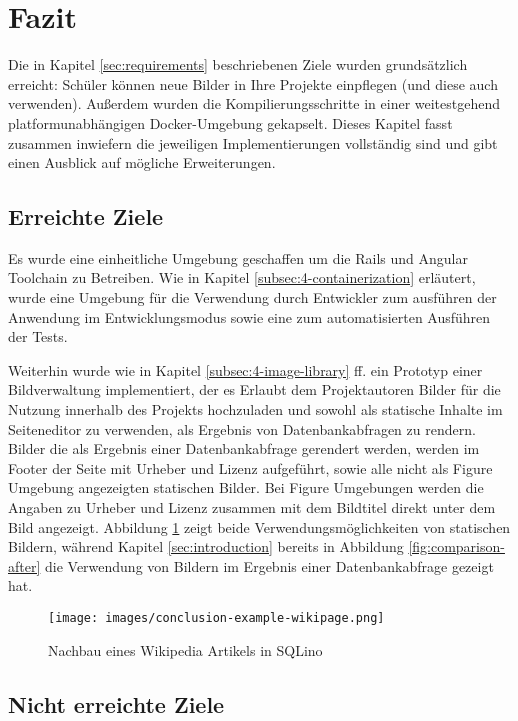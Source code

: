 \section{Fazit}
\label{sec:conclusion}

Die in Kapitel \ref{sec:requirements} beschriebenen Ziele wurden grundsätzlich erreicht:
Schüler können neue Bilder in Ihre Projekte einpflegen (und diese auch verwenden).
Außerdem wurden die Kompilierungsschritte in einer weitestgehend
platformunabhängigen Docker-Umgebung gekapselt. Dieses Kapitel fasst zusammen
inwiefern die jeweiligen Implementierungen vollständig sind und gibt einen Ausblick
auf mögliche Erweiterungen.

\subsection{Erreichte Ziele}

Es wurde eine einheitliche Umgebung geschaffen um die Rails und Angular
Toolchain zu Betreiben. Wie in Kapitel \ref{subsec:4-containerization} erläutert,
wurde eine Umgebung für die Verwendung durch Entwickler zum ausführen der
Anwendung im Entwicklungsmodus sowie eine zum automatisierten Ausführen der
Tests.

Weiterhin wurde wie in Kapitel \ref{subsec:4-image-library} ff. ein Prototyp einer
Bildverwaltung implementiert, der es Erlaubt dem Projektautoren Bilder für die
Nutzung innerhalb des Projekts hochzuladen und sowohl als statische Inhalte im
Seiteneditor zu verwenden, als Ergebnis von Datenbankabfragen zu rendern. Bilder
die als Ergebnis einer Datenbankabfrage gerendert werden, werden im Footer der
Seite mit Urheber und Lizenz aufgeführt, sowie alle nicht als Figure Umgebung
angezeigten statischen Bilder. Bei Figure Umgebungen werden die Angaben zu
Urheber und Lizenz zusammen mit dem Bildtitel direkt unter dem Bild angezeigt.
Abbildung \ref{fig:wiki-article} zeigt beide Verwendungsmöglichkeiten von
statischen Bildern, während Kapitel \ref{sec:introduction} bereits in Abbildung
\ref{fig:comparison-after} die Verwendung von Bildern im Ergebnis einer
Datenbankabfrage gezeigt hat.

\begin{figure}
  \centering\texttt{[image: images/conclusion-example-wikipage.png]}
  \caption{Nachbau eines Wikipedia Artikels in SQLino}
  \label{fig:wiki-article}
\end{figure}

\subsection{Nicht erreichte Ziele}

